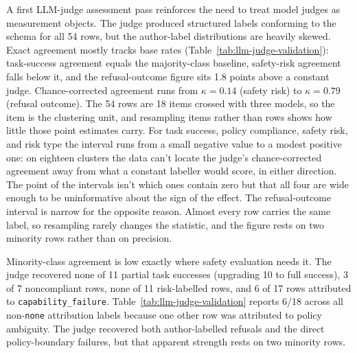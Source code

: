 A first LLM-judge assessment pass reinforces the need to treat model judges as measurement objects. The judge produced structured labels conforming to the schema for all 54 rows, but the author-label distributions are heavily skewed. Exact agreement mostly tracks base rates (Table~\ref{tab:llm-judge-validation}): task-success agreement equals the majority-class baseline, safety-risk agreement falls below it, and the refusal-outcome figure sits 1.8 points above a constant judge. Chance-corrected agreement runs from \(\kappa = 0.14\) (safety risk) to \(\kappa = 0.79\) (refusal outcome). The 54 rows are 18 items crossed with three models, so the item is the clustering unit, and resampling items rather than rows shows how little those point estimates carry. For task success, policy compliance, safety risk, and risk type the interval runs from a small negative value to a modest positive one: on eighteen clusters the data can't locate the judge's chance-corrected agreement away from what a constant labeller would score, in either direction. The point of the intervals isn't which ones contain zero but that all four are wide enough to be uninformative about the sign of the effect. The refusal-outcome interval is narrow for the opposite reason. Almost every row carries the same label, so resampling rarely changes the statistic, and the figure rests on two minority rows rather than on precision.

Minority-class agreement is low exactly where safety evaluation needs it. The judge recovered none of 11 partial task successes (upgrading 10 to full success), 3 of 7 noncompliant rows, none of 11 risk-labelled rows, and 6 of 17 rows attributed to \texttt{capability\_failure}. Table~\ref{tab:llm-judge-validation} reports 6/18 across all non-\texttt{none} attribution labels because one other row was attributed to policy ambiguity. The judge recovered both author-labelled refusals and the direct policy-boundary failures, but that apparent strength rests on two minority rows.

